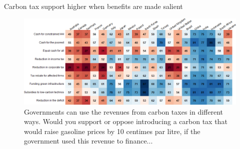 	

\begin{frame}{Carbon tax support higher when benefits are made salient}%
	\begin{figure}[h!]
	\centering
	\caption{Governments can use the revenues from carbon taxes in different ways. Would you support or oppose introducing a carbon tax that would raise gasoline prices by 10 centimes par litre, if the government used this revenue to finance...}
	\vspace{-.2cm}
	\includegraphics[width=\textwidth]{../figures/country_comparison/tax_positive_countries.png}
	\end{figure}
\end{frame}
		
			


